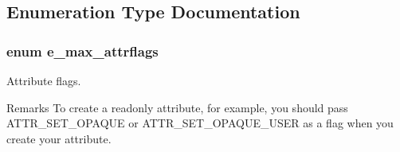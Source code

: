 \subsection{Enumeration Type Documentation}
\hypertarget{group__attr_gaf296cfc6741bb19207f6ed8062809115}{
\subsubsection[{e\_\-max\_\-attrflags}]{\setlength{\rightskip}{0pt plus 5cm}enum {\bf e\_\-max\_\-attrflags}}}
\label{group__attr_gaf296cfc6741bb19207f6ed8062809115}


Attribute flags. \begin{DoxyRemark}{Remarks}
To create a readonly attribute, for example, you should pass ATTR\_\-SET\_\-OPAQUE or ATTR\_\-SET\_\-OPAQUE\_\-USER as a flag when you create your attribute. 
\end{DoxyRemark}
